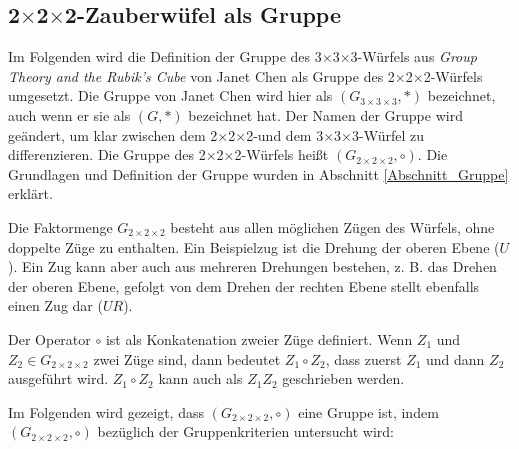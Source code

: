 \documentclass[12pt,a4paper, usenames, dvipsnames]{article}
\theoremstyle{mystyle}
\theoremstyle{definition}
\newcommand{\Gtwo}{\ensuremath{G_{2\times 2\times 2}}}
\newcommand{\Gthree}{\ensuremath{G_{3\times 3\times 3}}}
\newcommand{\Ttwo}{2$\times$2$\times$2-}
\newcommand{\Tthree}{3$\times$3$\times$3-}
\begin{document}
%
%
%
%
%
%
%
%
%
%
%
%
%
%
%
%
%
%
%

\subsection{\Ttwo Zauberwüfel als Gruppe} 
 \label{Abschnitt_WürfelAlsGruppe}

Im Folgenden wird die Definition der Gruppe des \Tthree Würfels aus \textit{Group Theory and the Rubik's Cube}  von Janet Chen \cite{JC} als Gruppe des \Ttwo Würfels umgesetzt. Die Gruppe von Janet Chen wird hier als $(\Gthree, *)$ bezeichnet, auch wenn er sie als $(G, *)$ bezeichnet hat. Der Namen der Gruppe wird geändert, um klar zwischen dem \Ttwo  und dem \Tthree Würfel zu differenzieren. Die Gruppe des \Ttwo Würfels heißt $(\Gtwo, \circ)$. 
Die Grundlagen und Definition der Gruppe wurden in Abschnitt \ref{Abschnitt_Gruppe} erklärt.


Die Faktormenge $\Gtwo$ besteht aus allen möglichen Zügen des Würfels, ohne doppelte Züge zu enthalten. Ein Beispielzug ist die Drehung der oberen Ebene ($U$). Ein Zug kann aber auch aus mehreren Drehungen bestehen, z. B. das Drehen der oberen Ebene, gefolgt von dem Drehen der rechten Ebene stellt ebenfalls einen Zug dar ($UR$). 


Der Operator $\circ$ ist als Konkatenation zweier Züge definiert. Wenn $Z_1$ und $Z_2 \in \Gtwo$ zwei Züge sind, dann bedeutet $Z_1 \circ Z_2$, dass zuerst $Z_1$ und dann $Z_2$ ausgeführt wird. $Z_1 \circ Z_2$ kann auch als $Z_1Z_2$ geschrieben werden.

Im Folgenden wird gezeigt, dass $(\Gtwo, \circ)$ eine Gruppe ist, indem $(\Gtwo, \circ)$ bezüglich der Gruppenkriterien untersucht wird:

\newpage
\end{document}
